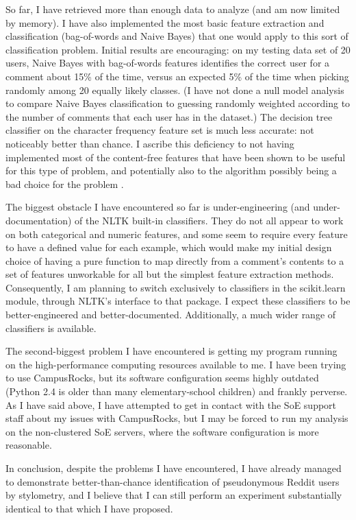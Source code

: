 \documentclass{article}
\begin{document}
So far, I have retrieved more than enough data to analyze (and am now limited by memory). I have also implemented the most basic feature extraction and classification (bag-of-words and Naive Bayes) that one would apply to this sort of classification problem. Initial results are encouraging: on my testing data set of 20 users, Naive Bayes with bag-of-words features identifies the correct user for a comment about 15\% of the time, versus an expected 5\% of the time when picking randomly among 20 equally likely classes. (I have not done a null model analysis to compare Naive Bayes classification to guessing randomly weighted according to the number of comments that each user has in the dataset.) The decision tree classifier on the character frequency feature set is much less accurate: not noticeably better than chance. I ascribe this deficiency to not having implemented most of the content-free features that have been shown to be useful for this type of problem, and potentially also to the algorithm possibly being a bad choice for the problem \cite{narayanan2012feasibility}.

The biggest obstacle I have encountered so far is under-engineering (and under-documentation) of the NLTK built-in classifiers. They do not all appear to work on both categorical and numeric features, and some seem to require every feature to have a defined value for each example, which would make my initial design choice of having a pure function to map directly from a comment's contents to a set of features unworkable for all but the simplest feature extraction methods. Consequently, I am planning to switch exclusively to classifiers in the scikit.learn module, through NLTK's interface to that package. I expect these classifiers to be better-engineered and better-documented. Additionally, a much wider range of classifiers is available.

The second-biggest problem I have encountered is getting my program running on the high-performance computing resources available to me. I have been trying to use CampusRocks, but its software configuration seems highly outdated (Python 2.4 is older than many elementary-school children) and frankly perverse. As I have said above, I have attempted to get in contact with the SoE support staff about my issues with CampusRocks, but I may be forced to run my analysis on the non-clustered SoE servers, where the software configuration is more reasonable.

In conclusion, despite the problems I have encountered, I have already managed to demonstrate better-than-chance identification of pseudonymous Reddit users by stylometry, and I believe that I can still perform an experiment substantially identical to that which I have proposed.
\end{document}
